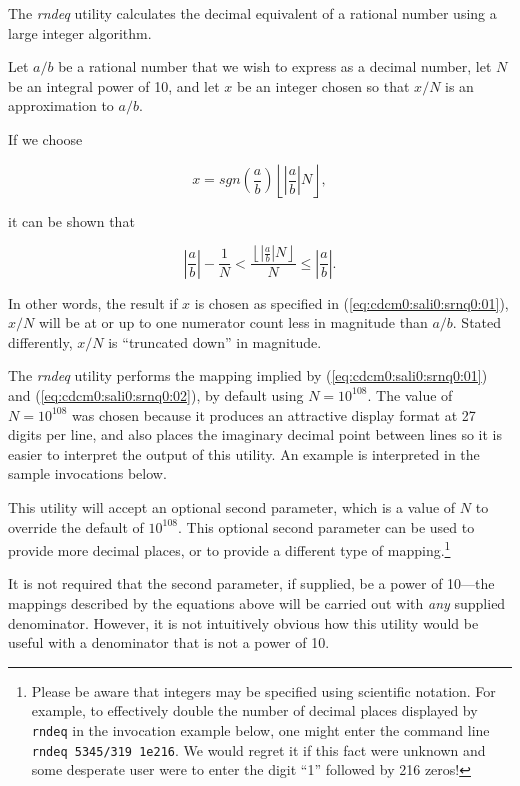 \begin{dosutilcommanddescription}
The \emph{rndeq} utility calculates the decimal equivalent
of a rational number using a large integer
algorithm.

Let $a/b$ be a rational number that we wish to express
as a decimal number, let $N$ be an integral power
of 10, and let $x$ be an integer chosen so that $x/N$
is an approximation to $a/b$.

If we choose

\begin{equation}
\label{eq:cdcm0:sali0:srnq0:01}
x = sgn \left( {\frac{a}{b}} \right)
\left\lfloor {\left| \frac{a}{b} \right| N} \right\rfloor ,
\end{equation}

it can be shown that

\begin{equation}
\label{eq:cdcm0:sali0:srnq0:02}
\left| {\frac{a}{b}} \right| - \frac{1}{N}
<
\frac{\left\lfloor {\left| {\frac{a}{b}} \right| N} \right\rfloor}{N}
\leq
\left|{\frac{a}{b}}\right|.
\end{equation}

In other words, the result if $x$ is chosen as specified in
(\ref{eq:cdcm0:sali0:srnq0:01}), $x/N$ will be at or up to one numerator
count less in magnitude than $a/b$.  Stated differently,
$x/N$ is ``truncated down'' in magnitude.

The \emph{rndeq} utility performs the mapping implied by 
(\ref{eq:cdcm0:sali0:srnq0:01}) and
(\ref{eq:cdcm0:sali0:srnq0:02}), by default using
$N=10^{108}$.  The value of $N=10^{108}$ was chosen
because it produces an attractive display format at
27 digits per line, and also places the imaginary decimal
point between lines so it is easier to interpret the output of
this utility.  An example is interpreted in the sample invocations
below.

This utility will accept an optional second parameter, which
is a value of $N$ to override the default of $10^{108}$.  This
optional second parameter can be used to provide more decimal places,
or to provide a different type of mapping.\footnote{Please be aware that integers
may be specified using scientific notation.  For example, to effectively double 
the number of decimal places displayed by \texttt{rndeq} in the 
invocation example below, one might enter the command line
\texttt{rndeq 5345/319 1e216}.  We would regret it if this fact were unknown
and some desperate user were to enter the digit ``1'' followed by
216 zeros!}

It is not required that the second parameter, if supplied, be a power of
10---the mappings described by the equations above will be carried
out with \emph{any} supplied denominator.  
However, it is not intuitively obvious how this utility would be
useful with a denominator that is not a power of 10.
\end{dosutilcommanddescription}

